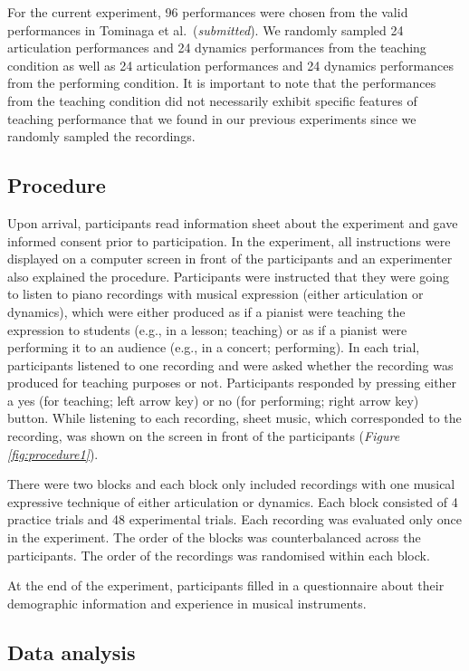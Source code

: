 \documentclass[
  man,floatsintext]{apa6}
\begin{document}
For the current experiment, 96 performances were chosen from the valid performances in Tominaga et al.~(\emph{submitted}). We randomly sampled 24 articulation performances and 24 dynamics performances from the teaching condition as well as 24 articulation performances and 24 dynamics performances from the performing condition. It is important to note that the performances from the teaching condition did not necessarily exhibit specific features of teaching performance that we found in our previous experiments since we randomly sampled the recordings.

\hypertarget{procedure}{%
\subsection{Procedure}\label{procedure}}

Upon arrival, participants read information sheet about the experiment and gave informed consent prior to participation. In the experiment, all instructions were displayed on a computer screen in front of the participants and an experimenter also explained the procedure. Participants were instructed that they were going to listen to piano recordings with musical expression (either articulation or dynamics), which were either produced as if a pianist were teaching the expression to students (e.g., in a lesson; teaching) or as if a pianist were performing it to an audience (e.g., in a concert; performing). In each trial, participants listened to one recording and were asked whether the recording was produced for teaching purposes or not. Participants responded by pressing either a yes (for teaching; left arrow key) or no (for performing; right arrow key) button. While listening to each recording, sheet music, which corresponded to the recording, was shown on the screen in front of the participants (\emph{Figure \ref{fig:procedure1}}).

There were two blocks and each block only included recordings with one musical expressive technique of either articulation or dynamics. Each block consisted of 4 practice trials and 48 experimental trials. Each recording was evaluated only once in the experiment. The order of the blocks was counterbalanced across the participants. The order of the recordings was randomised within each block.

At the end of the experiment, participants filled in a questionnaire about their demographic information and experience in musical instruments.

\hypertarget{dataanalysis}{%
\subsection{Data analysis}\label{dataanalysis}}
\end{document}

